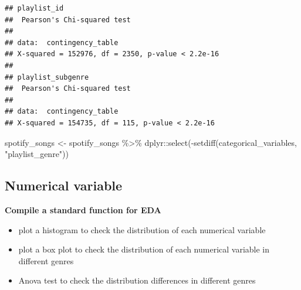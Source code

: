 \documentclass[
]{article}
\newenvironment{Shaded}{\begin{snugshade}}{\end{snugshade}}
\newcommand{\FunctionTok}[1]{\textcolor[rgb]{0.00,0.00,0.00}{#1}}
\newcommand{\NormalTok}[1]{#1}
\newcommand{\OtherTok}[1]{\textcolor[rgb]{0.56,0.35,0.01}{#1}}
\newcommand{\SpecialCharTok}[1]{\textcolor[rgb]{0.00,0.00,0.00}{#1}}
\newcommand{\StringTok}[1]{\textcolor[rgb]{0.31,0.60,0.02}{#1}}
\providecommand{\tightlist}{%
  \setlength{\itemsep}{0pt}\setlength{\parskip}{0pt}}
\begin{document}
\begin{verbatim}
## playlist_id
##  Pearson's Chi-squared test
## 
## data:  contingency_table
## X-squared = 152976, df = 2350, p-value < 2.2e-16
## 
## playlist_subgenre
##  Pearson's Chi-squared test
## 
## data:  contingency_table
## X-squared = 154735, df = 115, p-value < 2.2e-16
\end{verbatim}

\begin{Shaded}
\begin{Highlighting}[]
\NormalTok{spotify\_songs }\OtherTok{\textless{}{-}}\NormalTok{ spotify\_songs }\SpecialCharTok{\%\textgreater{}\%} 
\NormalTok{  dplyr}\SpecialCharTok{::}\FunctionTok{select}\NormalTok{(}\SpecialCharTok{{-}}\FunctionTok{setdiff}\NormalTok{(categorical\_variables, }\StringTok{"playlist\_genre"}\NormalTok{))}
\end{Highlighting}
\end{Shaded}

\hypertarget{numerical-variable}{%
\subsection{Numerical variable}\label{numerical-variable}}

\textbf{Compile a standard function for EDA}

\begin{itemize}
\tightlist
\item
  plot a histogram to check the distribution of each numerical variable
\item
  plot a box plot to check the distribution of each numerical variable
  in different genres
\item
  Anova test to check the distribution differences in different genres
\end{itemize}
\end{document}
